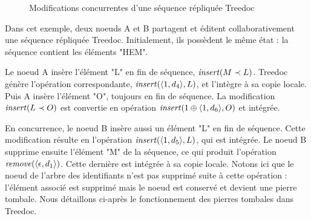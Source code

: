 \begin{figure}[!ht]
{
  }
  \caption{Modifications concurrentes d'une séquence répliquée Treedoc}
  \label{fig:treedoc}
\end{figure}

Dans cet exemple, deux noeuds A et B partagent et éditent collaborativement une séquence répliquée Treedoc.
Initialement, ils possèdent le même état : la séquence contient les éléments "HEM".

Le noeud A insère l'élément "L" en fin de séquence, \ie $\mathit{insert}(M \prec L)$.
Treedoc génère l'opération correspondante, $\mathit{insert}(\langle 1,d_4 \rangle, L)$, et l'intègre à sa copie locale.
Puis A insère l'élément "O", toujours en fin de séquence.
La modification $\mathit{insert}(L \prec O)$ est convertie en opération $\mathit{insert}(1 \oplus \langle 1,d_6 \rangle, O)$ et intégrée.

En concurrence, le noeud B insère aussi un élément "L" en fin de séquence.
Cette modification résulte en l'opération $\mathit{insert}(\langle 1,d_5 \rangle, L)$, qui est intégrée.
Le noeud B supprime ensuite l'élément "M" de la séquence, ce qui produit l'opération $\mathit{remove}(\langle \epsilon,d_1 \rangle)$.
Cette dernière est intégrée à sa copie locale.
Notons ici que le noeud de l'arbre des identifiants n'est pas supprimé suite à cette opération : l'élément associé est supprimé mais le noeud est conservé et devient une pierre tombale.
Nous détaillons ci-après le fonctionnement des pierres tombales dans Treedoc.

